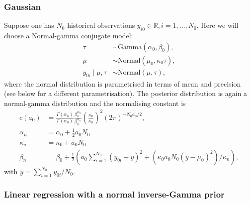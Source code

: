 \documentclass[a4paper, notitlepage, 11pt]{article}
\begin{document}
\subsubsection{Gaussian}

Suppose one has $N_0$ historical observations $y_{i0} \in \mathbb{R}, i = 1, \ldots, N_0$.
Here we will choose a Normal-gamma conjugate model:
\begin{align*}
 \tau &\sim \text{Gamma}(\alpha_0, \beta_0),\\
 \mu &\sim \text{Normal}(\mu_0, \kappa_0\tau ),\\
 y_{0i} \mid \mu, \tau &\sim \text{Normal}(\mu, \tau),
\end{align*}
where the normal distribution is parametrised in terms of mean and precision (see below for a different parametrisation).
The posterior distribution is again a normal-gamma distribution and the normalising constant is
\begin{align}
 \label{eq:cA0_gaussian}
 c(a_0) &= \frac{\Gamma(\alpha_n)}{\Gamma(\alpha_0)}\frac{\beta_0^{\alpha_0}}{\beta_n^{\alpha_n}} \left(\frac{\kappa_0}{\kappa_n} \right)^2 (2\pi)^{-N_0 a_0/2},\\
 \nonumber
 \alpha_n &= \alpha_0 + \frac{1}{2}a_0N_0 \\
 \nonumber
 \kappa_n &= \kappa_0 + a_0N_0 \\
 \nonumber
 \beta_n  &= \beta_0 + \frac{1}{2}\left( a_0\sum_{i=1}^{N_0}(y_{0i}-\bar{y})^2 + \left(\kappa_0 a_0 N_0 (\bar{y}-\mu_0)^2\right)/\kappa_n \right),
\end{align}
with $\bar{y} = \sum_{i=1}^{N_0} y_{0i}/N_0$.

\subsubsection{Linear regression with a normal inverse-Gamma prior}
\end{document}
